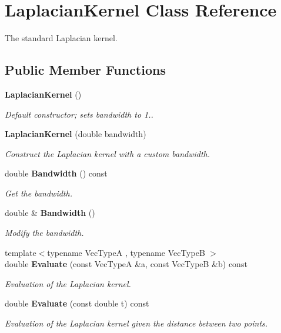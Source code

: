 \section{Laplacian\+Kernel Class Reference}
\label{classmlpack_1_1kernel_1_1LaplacianKernel}


The standard Laplacian kernel.  


\subsection*{Public Member Functions}
\begin{DoxyCompactItemize}
\item 
\textbf{ Laplacian\+Kernel} ()
\begin{DoxyCompactList}\small\item\em Default constructor; sets bandwidth to 1.. \end{DoxyCompactList}\item 
\textbf{ Laplacian\+Kernel} (double bandwidth)
\begin{DoxyCompactList}\small\item\em Construct the Laplacian kernel with a custom bandwidth. \end{DoxyCompactList}\item 
double \textbf{ Bandwidth} () const
\begin{DoxyCompactList}\small\item\em Get the bandwidth. \end{DoxyCompactList}\item 
double \& \textbf{ Bandwidth} ()
\begin{DoxyCompactList}\small\item\em Modify the bandwidth. \end{DoxyCompactList}\item 
{\footnotesize template$<$typename Vec\+TypeA , typename Vec\+TypeB $>$ }\\double \textbf{ Evaluate} (const Vec\+TypeA \&a, const Vec\+TypeB \&b) const
\begin{DoxyCompactList}\small\item\em Evaluation of the Laplacian kernel. \end{DoxyCompactList}\item 
double \textbf{ Evaluate} (const double t) const
\begin{DoxyCompactList}\small\item\em Evaluation of the Laplacian kernel given the distance between two points. \end{DoxyCompactList}\item 

\end{DoxyCompactItemize}
